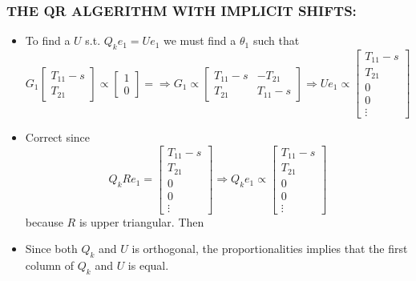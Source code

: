 \documentclass[a4paper,8pt]{beamer} %
\newcommand{\smatrix}[1]{\left[\begin{matrix} #1 \end{matrix}\right]}
\begin{document}
\begin{frame}  %
\frametitle{THE QR ALGERITHM WITH IMPLICIT SHIFTS:}
	\begin{itemize}
		\item
			To find a $U$ s.t. $Q_ke_1=Ue_1$ we must find a $\theta_1$ such that
			\begin{equation}
				G_1 
				\smatrix{ T_{11}-s \\ T_{21} } \propto \smatrix{ 1 \\ 0} = 
				\Rightarrow
				G_1 \propto  \smatrix{T_{11}-s & -T_{21} \\ T_{21} & T_{11}-s}
				\Rightarrow
				Ue_1 \propto \smatrix{T_{11}-s\\T_{21} \\0\\0\\ \vdots}
			\end{equation}
		\item
			Correct since
			\begin{equation}
				Q_kRe_1 = \smatrix{T_{11}-s\\T_{21}\\0\\0\\ \vdots} 
				\Rightarrow Q_ke_1 \propto  \smatrix{T_{11}-s\\T_{21} \\0\\0\\ \vdots}
			\end{equation}
			because $R$ is upper triangular. Then
		\item
			Since both $Q_k$ and $U$ is orthogonal, the proportionalities implies that 
			the first column of $Q_k$ and $U$ is equal.
	\end{itemize}
\end{frame}%
\end{document}
